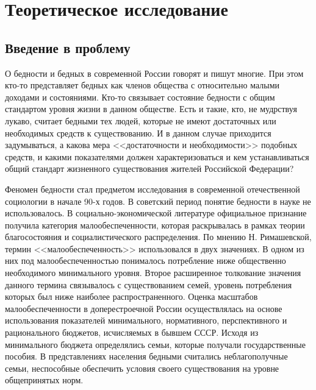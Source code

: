 \chapter{Теоретическое исследование}

\section{Введение в проблему}
О бедности и бедных в современной России говорят и пишут многие. При этом 
кто-то представляет бедных как членов общества с относительно малыми доходами 
и состояниями. Кто-то связывает состояние бедности с общим стандартом уровня 
жизни в данном обществе. Есть и такие, кто, не мудрствуя лукаво, считает 
бедными тех людей, которые не имеют достаточных или необходимых средств к 
существованию. И в данном случае приходится задумываться, а какова мера 
<<достаточности и необходимости>> подобных средств, и какими показателями 
должен характеризоваться и кем устанавливаться общий стандарт жизненного 
существования жителей Российской Федерации? 

Феномен бедности стал предметом исследования в современной отечественной 
социологии в начале 90-х годов. В советский период понятие бедности в науке 
не использовалось. В социально-экономической литературе официальное признание 
получила категория малообеспеченности, которая раскрывалась в рамках теории 
благосостояния и социалистического распределения. По мнению Н. Римашевской, 
термин <<малообеспеченность>> использовался в двух значениях. В одном из них 
под малообеспеченностью понималось потребление ниже общественно необходимого 
минимального уровня. Второе расширенное толкование значения данного термина 
связывалось с существованием семей, уровень потребления которых был ниже 
наиболее распространенного. Оценка масштабов малообеспеченности в 
доперестроечной России осуществлялась на основе использования показателей 
минимального, нормативного, перспективного и рационального бюджетов, 
исчисляемых в бывшем СССР. Исходя из минимального бюджета определялись 
семьи, которые получали государственные пособия. В представлениях населения 
бедными считались неблагополучные семьи, неспособные обеспечить условия 
своего существования на уровне общепринятых норм.

